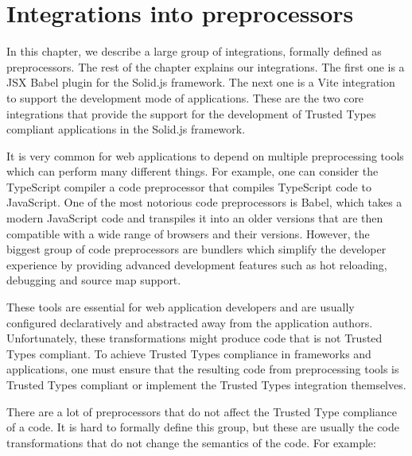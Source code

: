 \chapter{Integrations into preprocessors}

In this chapter, we describe a large group of integrations, formally defined as preprocessors. The
rest of the chapter explains our integrations. The first one is a JSX Babel plugin for the Solid.js
framework. The next one is a Vite integration to support the development mode of applications. These
are the two core integrations that provide the support for the development of Trusted Types
compliant applications in the Solid.js framework.

It is very common for web applications to depend on multiple preprocessing tools which can perform
many different things. For example, one can consider the TypeScript compiler a code preprocessor
that compiles TypeScript code to JavaScript. One of the most notorious code preprocessors is Babel,
which takes a modern JavaScript code and transpiles it into an older versions that are then
compatible with a wide range of browsers and their versions. However, the biggest group of code
preprocessors are bundlers which simplify the developer experience by providing advanced development
features such as hot reloading, debugging and source map support.

These tools are essential for web application developers and are usually configured declaratively
and abstracted away from the application authors. Unfortunately, these transformations might produce
code that is not Trusted Types compliant. To achieve Trusted Types compliance in frameworks and
applications, one must ensure that the resulting code from preprocessing tools is Trusted Types
compliant or implement the Trusted Types integration themselves.

There are a lot of preprocessors that do not affect the Trusted Type compliance of a code. It is
hard to formally define this group, but these are usually the code transformations that do not
change the semantics of the code. For example:

